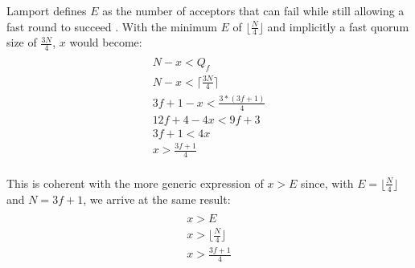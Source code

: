 Lamport defines $E$ as the number of acceptors that can fail while still allowing a fast round to succeed \cite{L06}. With the minimum $E$ of $\lfloor\frac{N}{4}\rfloor$ and implicitly a fast quorum size of $\frac{3N}{4}$, $x$ would become:
\begin{gather*} \\
N - x < Q_f \label{eq_1} \tag{1} \\ 
N - x < \lceil\frac{3N}{4}\rceil \label{eq_2} \tag{2} \\
3f+1 - x < \frac{3*(3f+1)}{4} \label{eq_3} \tag{3} \\
12f+4 -4x < 9f+3 \label{eq_4} \tag{4} \\ 
3f+1 < 4x \label{eq_5} \tag{5} \\ 
x > \frac{3f+1}{4} \label{eq_6} \tag{6} \\ 
\end{gather*}

This is coherent with the more generic expression of $x > E$ since, with $E = \lfloor\frac{N}{4}\rfloor$ and $N = 3f+1$, we arrive at the same result: 
\begin{gather*} \\
x > E  \\
x > \lfloor\frac{N}{4}\rfloor \\
x >\frac{3f+1}{4}\\
\end{gather*}


